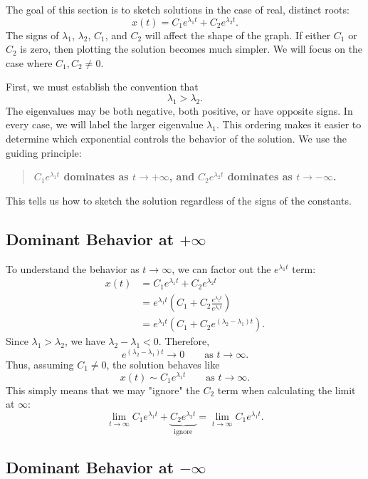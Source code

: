 \documentclass[10pt,letterpaper]{article}
\begin{document}
The goal of this section is to sketch solutions in the case of real,
distinct roots:
\[
x(t)=C_1e^{\lambda_1t}+C_2e^{\lambda_2t}.
\]
The signs of $\lambda_1$, $\lambda_2$, $C_1$, and $C_2$ will affect the
shape of the graph. If either $C_1$ or $C_2$ is zero, then plotting the solution becomes
much simpler. We will focus on the case where $C_1,C_2\neq0$.

First, we must establish the convention that  
\[
\lambda_1>\lambda_2.
\]
The eigenvalues may be both negative, both positive, or have opposite
signs. In every case, we will label the larger eigenvalue $\lambda_1$. This ordering makes it easier to determine which exponential controls
the behavior of the solution. We use the
guiding principle:
\begin{quote}
\textbf{$C_1e^{\lambda_1t}$ dominates as $t\to+\infty$, and}
\textbf{$C_2e^{\lambda_2t}$ dominates as $t\to-\infty$.}
\end{quote}
This tells us how to sketch the solution regardless of the signs of the constants.

\subsection{Dominant Behavior at $+\infty$}

To understand the behavior as $t\to\infty$, we can factor out the
$e^{\lambda_1t}$ term:
\begin{align*}
    x(t) &= C_1e^{\lambda_1t}+C_2e^{\lambda_2t}\\
         &= e^{\lambda_1t}
            \left(C_1+C_2\frac{e^{\lambda_2t}}{e^{\lambda_1t}}\right)\\
         &= e^{\lambda_1t}
            \left(C_1+C_2e^{(\lambda_2-\lambda_1)t}\right).
\end{align*}
Since $\lambda_1>\lambda_2$, we have $\lambda_2-\lambda_1<0$. Therefore,
\[
e^{(\lambda_2-\lambda_1)t}\to0
\qquad\text{as }t\to\infty.
\]
Thus, assuming $C_1\neq0$, the solution behaves like
\[
x(t)\sim C_1e^{\lambda_1t}
\qquad\text{as }t\to\infty.
\]
This simply means that we may "ignore" the $C_2$ term when calculating the limit at $\infty$:
$$ 
    \lim_{t\to \infty} C_1e^{\lambda_1t}+\underbrace{C_2e^{\lambda_2t}}_{\text{ignore}} = \lim_{t\to\infty} C_1 e^{\lambda_1 t}.
$$

\subsection{Dominant Behavior at $-\infty$}
\end{document}
